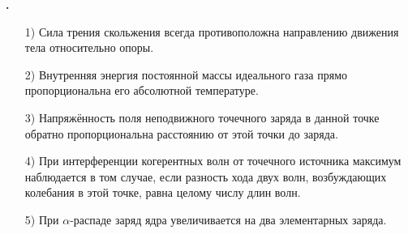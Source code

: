 \documentclass[12pt,a4paper]{article}
\newif\ifShowSolutions
\newcounter{banktask}
\newcommand{\BankTask}[3]{%
  \refstepcounter{banktask}%
  \Needspace{35mm}\par\medskip\noindent\begin{minipage}{\linewidth}%
  \noindent\textbf{\thebanktask.}\quad #2\par
  \ifShowSolutions
    #3\par
    \ifdefined\TutorEdition
      \ifcsname TutorSource#1\endcsname
        \smallskip{\small\csname TutorSource#1\endcsname\par}%
      \fi
    \fi
  \fi
  \end{minipage}\par\medskip
}
\begin{document}
\BankTask{E70C7D}{
\begin{enumerate}
\item[1)] Сила трения скольжения всегда противоположна направлению движения тела относительно опоры.
\item[2)] Внутренняя энергия постоянной массы идеального газа прямо пропорциональна его абсолютной температуре.
\item[3)] Напряжённость поля неподвижного точечного заряда в данной точке обратно пропорциональна расстоянию от этой точки до заряда.
\item[4)] При интерференции когерентных волн от точечного источника максимум наблюдается в том случае, если разность хода двух волн, возбуждающих колебания в этой точке, равна целому числу длин волн.
\item[5)] При \(\alpha\)-распаде заряд ядра увеличивается на два элементарных заряда.
\end{enumerate}
}{
\smallskip\noindent\textbf{Решение от GPT}\par
1) Верно: сила трения скольжения направлена против скорости движения тела относительно опоры. 2) Верно: для постоянной массы идеального газа \(U=\frac{i}{2}\nu RT\), поэтому \(U\propto T\). 3) Неверно: \(E=\frac{k|q|}{r^2}\), то есть напряжённость обратно пропорциональна квадрату расстояния. 4) Верно: условие интерференционного максимума \(\Delta=m\lambda\), где \(m\in\mathbb{Z}\). 5) Неверно: при \(\alpha\)-распаде ядро испускает частицу с зарядом \(+2e\), поэтому заряд оставшегося ядра уменьшается на \(2e\). Ответ: \(124\).
}
\end{document}

